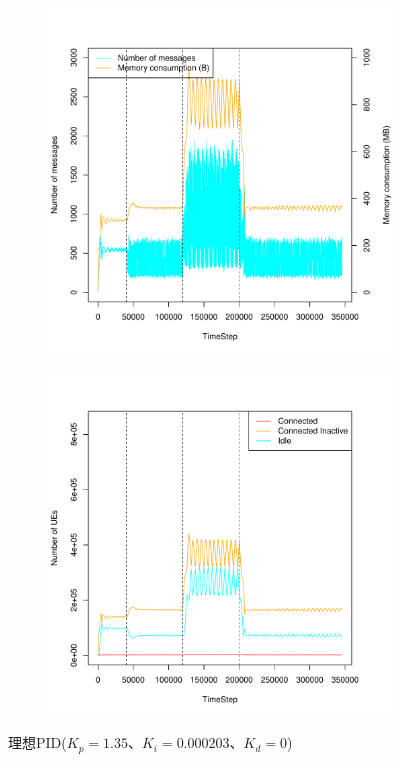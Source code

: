 \documentclass[a4j]{ujarticle}
\begin{document}
\begin{figure}[htbp]
\begin{subfigure}{0.49\hsize}
   \includegraphics[width=1.0\hsize]{scenario_7_signaling_and_memoryload_vs_timeStep_0_691200_1-35_0-000203_0_0_addIn6000s_random.pdf}
   \label{subfig:scenario_7_signaling_and_memoryload_vs_timeStep_0_691200_1-35_0-000203_0_0_addIn6000s_random}
 \end{subfigure}
 \begin{subfigure}{0.49\hsize}
   \centering
   \includegraphics[width=1.0\hsize]{scenario_7_stateBreakdown_0_691200_1-35_0-000203_0_0_addIn6000s_random.pdf}
   \label{subfig:scenario_7_stateBreakdown_0_691200_1-35_0-000203_0_0_addIn6000s_random}
 \end{subfigure}
 \caption{理想PID($K_p = 1.35、K_i = 0.000203、K_d = 0$)}
 \label{fig:result_pi_scenario7_addIn6000s_random}
\end{figure}
\end{document}

